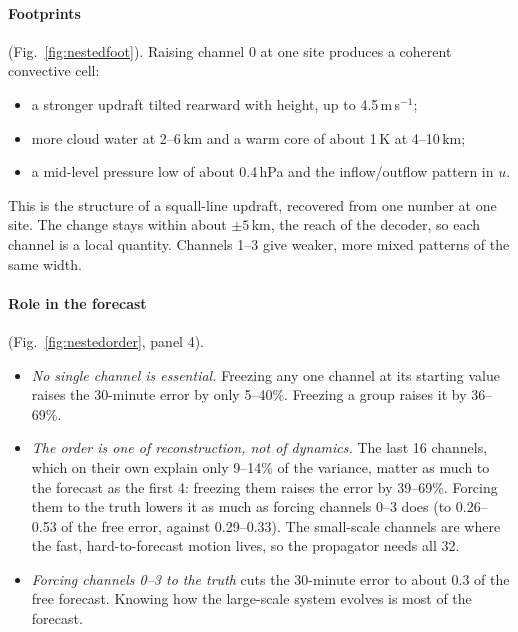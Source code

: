 \documentclass[11pt]{article}
\begin{document}
\paragraph{Footprints} (Fig.~\ref{fig:nestedfoot}). Raising channel 0 at one site produces a coherent convective cell:
\begin{itemize}
\item a stronger updraft tilted rearward with height, up to 4.5\,m\,s$^{-1}$;
\item more cloud water at 2--6\,km and a warm core of about 1\,K at 4--10\,km;
\item a mid-level pressure low of about 0.4\,hPa and the inflow/outflow pattern in $u$.
\end{itemize}
This is the structure of a squall-line updraft, recovered from one number at one site. The change stays within about $\pm 5$\,km, the reach of the decoder, so each channel is a local quantity. Channels 1--3 give weaker, more mixed patterns of the same width.

\paragraph{Role in the forecast} (Fig.~\ref{fig:nestedorder}, panel 4).
\begin{itemize}
\item \emph{No single channel is essential.} Freezing any one channel at its starting value raises the 30-minute error by only 5--40\%. Freezing a group raises it by 36--69\%.
\item \emph{The order is one of reconstruction, not of dynamics.} The last 16 channels, which on their own explain only 9--14\% of the variance, matter as much to the forecast as the first 4: freezing them raises the error by 39--69\%. Forcing them to the truth lowers it as much as forcing channels 0--3 does (to 0.26--0.53 of the free error, against 0.29--0.33). The small-scale channels are where the fast, hard-to-forecast motion lives, so the propagator needs all 32.
\item \emph{Forcing channels 0--3 to the truth} cuts the 30-minute error to about 0.3 of the free forecast. Knowing how the large-scale system evolves is most of the forecast.
\end{itemize}
\end{document}
